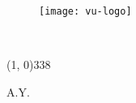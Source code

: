 \frontmatter
\begin{titlepage}

\begin{center}

\begin{LARGE}
\textbf{\myUni}\\
\end{LARGE}

\vspace{10pt}

\begin{Large}
\textsc{\myDepartment}\\
\end{Large}

\vspace{10pt}

\begin{large}	
\textsc{\myFaculty}\\
\end{large}

\vspace{70pt}
\begin{figure}[htbp]
\begin{center}
\texttt{[image: vu-logo]}
\end{center}
\end{figure}
\vspace{70pt}

\begin{LARGE}
\begin{center}
\textbf{\myTitle}\\
\end{center}
\end{LARGE}

\vspace{220pt}

\line(1, 0){338} \\
\begin{normalsize}
\textsc{A.Y. \myAA}
\end{normalsize}

\end{center}
\end{titlepage}
